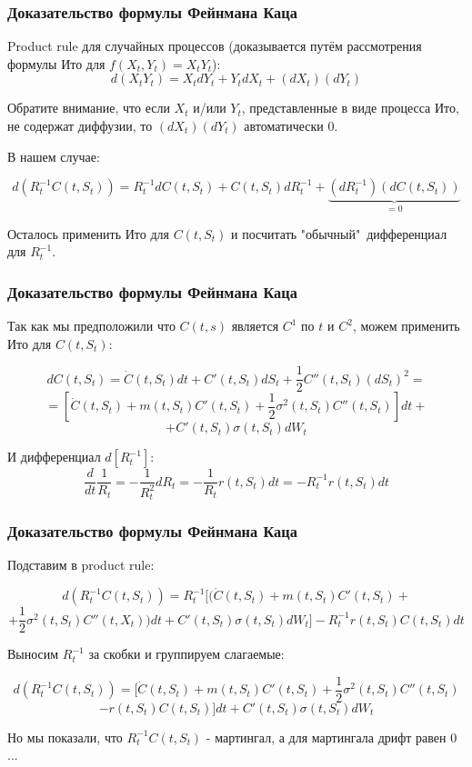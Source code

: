 \documentclass{beamer}
\begin{document}
\begin{frame}
\frametitle{Доказательство формулы Фейнмана Каца}

Product rule для случайных процессов (доказывается путём рассмотрения формулы Ито для $f(X_t, Y_t) = X_t Y_t$): 
\[
d(X_t Y_t) = X_t dY_t + Y_t d X_t + (d X_t) (d Y_t)
\]

Обратите внимание, что если $X_t$ и/или $Y_t$, представленные в виде процесса Ито, не содержат диффузии, то $(d X_t) (d Y_t)$ автоматически $0$.

В нашем случае:

\[
d(R_t^{-1}C(t, S_t)) = R_t^{-1} d C(t, S_t) + C(t, S_t) d R_t^{-1} + \underbrace{(d R_t^{-1})(d C(t, S_t))}_{=0}
\]

Осталось применить Ито для $C(t, S_t)$ и посчитать "обычный"\ дифференциал для $R_t^{-1}$.

\end{frame}

\begin{frame}
\frametitle{Доказательство формулы Фейнмана Каца}

Так как мы предположили что \(C(t, s)\) является \(C^1\) по \(t\) и \(C^2\), можем применить Ито для $C(t, S_t)$:

\[
d C(t, S_t) = \dot{C}(t, S_t)dt + C'(t, S_t) d S_t + \frac{1}{2}C''(t, S_t) (d S_t)^2 = 
\]
\[
= [\dot{C}(t, S_t) + m(t, S_t)C'(t, S_t) + \frac{1}{2} \sigma^2(t, S_t)C''(t, S_t)] dt +
\]
\[
+ C'(t, S_t) \sigma(t, S_t)d W_t
\]

И дифференциал $d[R_t^{-1}]$:
\[
\frac{d}{dt} \frac{1}{R_t} = - \frac{1}{R_t^2} d R_t = -\frac{1}{R_t}r(t, S_t) dt = - R_t^{-1} r(t, S_t) dt
\]

\end{frame}

\begin{frame}
\frametitle{Доказательство формулы Фейнмана Каца}

Подставим в product rule:

\[
d(R_t^{-1} C(t, S_t)) = R_t^{-1} [(\dot{C}(t, S_t) + m(t, S_t)C'(t, S_t) +
\]
\[
+ \frac{1}{2} \sigma^2(t, S_t)C''(t, X_t)) dt + C'(t, S_t) \sigma(t, S_t)d W_t] - R_t^{-1} r(t, S_t) C(t, S_t) dt 
\]

Выносим $R_t^{-1}$ за скобки и группируем слагаемые:

\[
d(R_t^{-1} C(t, S_t)) = [\dot{C}(t, S_t) +  m(t, S_t)C'(t, S_t) + \frac{1}{2} \sigma^2(t, S_t)C''(t, S_t) 
\]
\[
- r(t, S_t) C(t, S_t)] dt + C'(t, S_t) \sigma(t, S_t)d W_t
\]

Но мы показали, что \(R_t^{-1} C(t, S_t)\) - мартингал, а для мартингала дрифт равен $0$...

\end{frame}
\end{document}
